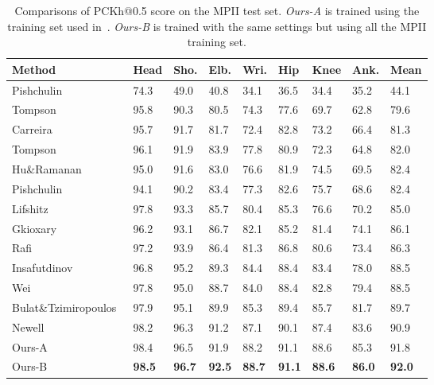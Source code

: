 \documentclass[10pt,twocolumn,letterpaper]{article}
\begin{document}
\begin{table}
	\begin{footnotesize}
		\centering
		\caption{ Comparisons of PCKh@0.5 score on the MPII test set. 
			\textit{Ours-A} is trained using the training set used in~\cite{tompson2015efficient}. 
			\textit{Ours-B} is trained with the same settings but using all the MPII training set.  
}
		\begin{tabular} 
			{@{}p{2.6cm}p{0.3cm}p{0.3cm}p{0.3cm}p{0.3cm}p{0.3cm}p{0.3cm}p{0.3cm}p{0.5cm}}
			\hline
			Method & Head & Sho. & Elb. & Wri. & Hip & Knee & Ank. & Mean\\
			\hline
			Pishchulin \etal~\cite{pishchulin2013strong} & 74.3  & 49.0  & 40.8  & 34.1  & 36.5  & 34.4 & 35.2 & 44.1  \\
			Tompson \etal~\cite{tompson2014joint}& 95.8  & 90.3  & 80.5  & 74.3  & 77.6  & 69.7 & 62.8 & 79.6  \\
			Carreira \etal~\cite{carreira2016human} & 95.7  & 91.7  & 81.7  & 72.4  & 82.8  & 73.2 & 66.4 & 81.3  \\
			Tompson \etal~\cite{tompson2015efficient}& 96.1  & 91.9  & 83.9  & 77.8  & 80.9  & 72.3 & 64.8 & 82.0  \\
			Hu\&Ramanan~\cite{hu2016bottom} & 95.0  & 91.6  & 83.0  & 76.6  & 81.9  & 74.5 & 69.5 & 82.4  \\
			Pishchulin \etal~\cite{pishchulin2016deepcut} & 94.1  & 90.2  & 83.4  & 77.3  & 82.6  & 75.7 & 68.6 & 82.4   \\
			Lifshitz \etal~\cite{lifshitz2016human} & 97.8  & 93.3  & 85.7  & 80.4  & 85.3  & 76.6 & 70.2 & 85.0   \\
			Gkioxary \etal~\cite{gkioxari2016chained} & 96.2  & 93.1  & 86.7  & 82.1  & 85.2  & 81.4 & 74.1 & 86.1   \\
			Rafi \etal~\cite{rafi2016efficient} & 97.2  & 93.9  & 86.4  & 81.3  & 86.8  & 80.6 & 73.4 & 86.3   \\
			Insafutdinov \etal~\cite{insafutdinov2016deepercut} & 96.8  & 95.2  & 89.3  & 84.4  & 88.4  & 83.4 & 78.0 & 88.5   \\
			Wei \etal~\cite{wei2016convolutional} & 97.8  & 95.0  & 88.7  & 84.0  & 88.4  & 82.8 & 79.4 & 88.5   \\
			Bulat\&Tzimiropoulos~\cite{bulat2016human} & 97.9  & 95.1  & 89.9  & 85.3  & 89.4  & 85.7 & 81.7 & 89.7   \\
			Newell \etal~\cite{newell2016stacked} & 98.2  & 96.3  & 91.2  & 87.1  & 90.1  & 87.4 & 83.6 & 90.9   \\
\hline  
Ours-A& 98.4  & 96.5  & 91.9  & 88.2  & 91.1  & 88.6 & 85.3 & 91.8  \\
			Ours-B& \textbf{98.5}  &\textbf{96.7}  & \textbf{92.5}  & \textbf{88.7}  & \textbf{91.1}  & \textbf{88.6} &\textbf{86.0} & \textbf{92.0}  \\
			\hline
		\end{tabular}
		\label{tab:MPII}
	\end{footnotesize}
\end{table}
\end{document}
